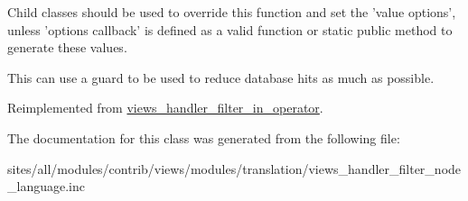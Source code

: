 Child classes should be used to override this function and set the 'value options', unless 'options callback' is defined as a valid function or static public method to generate these values.

This can use a guard to be used to reduce database hits as much as possible. 

Reimplemented from \hyperlink{classviews__handler__filter__in__operator_a5b5df6d90f4359ed28c0c446bdc81a6}{views\_\-handler\_\-filter\_\-in\_\-operator}.

The documentation for this class was generated from the following file:\begin{CompactItemize}
\item 
sites/all/modules/contrib/views/modules/translation/views\_\-handler\_\-filter\_\-node\_\-language.inc\end{CompactItemize}
